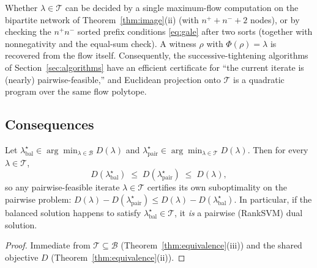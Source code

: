 \begin{corollary}
\label{cor:membership}
Whether $\lambda \in \mathcal{T}$ can be decided by a single maximum-flow
computation on the bipartite network of Theorem~\ref{thm:image}(ii) (with
$n^+ + n^- + 2$ nodes), or by checking the $n^+ n^-$ sorted prefix conditions
\eqref{eq:gale} after two sorts (together with nonnegativity and the
equal-sum check). A witness $\rho$ with $\Phi(\rho) = \lambda$
is recovered from the flow itself. Consequently, the successive-tightening
algorithms of Section~\ref{sec:algorithms} have an efficient certificate for
``the current iterate is (nearly) pairwise-feasible,'' and Euclidean
projection onto $\mathcal{T}$ is a quadratic program over the same flow
polytope.
\end{corollary}

\subsection{Consequences}
\label{sec:consequences}

\begin{corollary}
\label{cor:sandwich}
Let $\lambda^\star_{\mathrm{bal}} \in \arg\min_{\lambda \in \mathcal{B}}
D(\lambda)$ and $\lambda^\star_{\mathrm{pair}} \in \arg\min_{\lambda \in
\mathcal{T}} D(\lambda)$. Then for every $\lambda \in \mathcal{T}$,
\begin{equation}
D(\lambda^\star_{\mathrm{bal}})
\;\le\; D(\lambda^\star_{\mathrm{pair}})
\;\le\; D(\lambda),
\label{eq:sandwich}
\end{equation}
so any pairwise-feasible iterate $\lambda \in \mathcal{T}$ certifies its own
suboptimality on the pairwise problem:
$D(\lambda) - D(\lambda^\star_{\mathrm{pair}})
\le D(\lambda) - D(\lambda^\star_{\mathrm{bal}})$.
In particular, if the balanced solution happens to satisfy
$\lambda^\star_{\mathrm{bal}} \in \mathcal{T}$, it \emph{is} a pairwise
(RankSVM) dual solution.
\end{corollary}

\begin{proof}
Immediate from $\mathcal{T} \subseteq \mathcal{B}$
(Theorem~\ref{thm:equivalence}(iii)) and the shared objective $D$
(Theorem~\ref{thm:equivalence}(ii)).
\end{proof}

